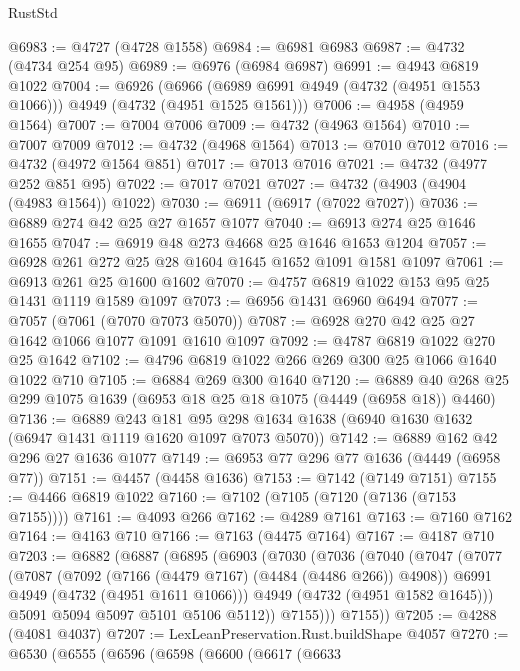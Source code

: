\begin{lexlean}{RustStd}
\begin{coremodule}
@6983 := @4727 (@4728 @1558)
@6984 := @6981 @6983
@6987 := @4732 (@4734 @254 @95)
@6989 := @6976 (@6984 @6987)
@6991 := @4943 @6819 @1022
@7004 := @6926
    (@6966 (@6989 @6991 @4949 (@4732 (@4951 @1553 @1066))) @4949 (@4732 (@4951 @1525 @1561)))
@7006 := @4958 (@4959 @1564)
@7007 := @7004 @7006
@7009 := @4732 (@4963 @1564)
@7010 := @7007 @7009
@7012 := @4732 (@4968 @1564)
@7013 := @7010 @7012
@7016 := @4732 (@4972 @1564 @851)
@7017 := @7013 @7016
@7021 := @4732 (@4977 @252 @851 @95)
@7022 := @7017 @7021
@7027 := @4732 (@4903 (@4904 (@4983 @1564)) @1022)
@7030 := @6911 (@6917 (@7022 @7027))
@7036 := @6889 @274 @42 @25 @27 @1657 @1077
@7040 := @6913 @274 @25 @1646 @1655
@7047 := @6919 @48 @273 @4668 @25 @1646 @1653 @1204
@7057 := @6928 @261 @272 @25 @28 @1604 @1645 @1652 @1091 @1581 @1097
@7061 := @6913 @261 @25 @1600 @1602
@7070 := @4757 @6819 @1022 @153 @95 @25 @1431 @1119 @1589 @1097
@7073 := @6956 @1431 @6960 @6494
@7077 := @7057 (@7061 (@7070 @7073 @5070))
@7087 := @6928 @270 @42 @25 @27 @1642 @1066 @1077 @1091 @1610 @1097
@7092 := @4787 @6819 @1022 @270 @25 @1642
@7102 := @4796 @6819 @1022 @266 @269 @300 @25 @1066 @1640 @1022 @710
@7105 := @6884 @269 @300 @1640
@7120 := @6889 @40 @268 @25 @299 @1075 @1639 (@6953 @18 @25 @18 @1075 (@4449 (@6958 @18)) @4460)
@7136 := @6889
    @243
    @181
    @95
    @298
    @1634
    @1638
    (@6940 @1630 @1632 (@6947 @1431 @1119 @1620 @1097 @7073 @5070))
@7142 := @6889 @162 @42 @296 @27 @1636 @1077
@7149 := @6953 @77 @296 @77 @1636 (@4449 (@6958 @77))
@7151 := @4457 (@4458 @1636)
@7153 := @7142 (@7149 @7151)
@7155 := @4466 @6819 @1022
@7160 := @7102 (@7105 (@7120 (@7136 (@7153 @7155))))
@7161 := @4093 @266
@7162 := @4289 @7161
@7163 := @7160 @7162
@7164 := @4163 @710
@7166 := @7163 (@4475 @7164)
@7167 := @4187 @710
@7203 := @6882
    (@6887
      (@6895
        (@6903
          (@7030
            (@7036
              (@7040
                (@7047
                  (@7077
                    (@7087
                      (@7092 (@7166 (@4479 @7167) (@4484 (@4486 @266)) @4908))
                      @6991
                      @4949
                      (@4732 (@4951 @1611 @1066)))
                    @4949
                    (@4732 (@4951 @1582 @1645)))
                  @5091
                  @5094
                  @5097
                  @5101
                  @5106
                  @5112))
              @7155)))
        @7155))
@7205 := @4288 (@4081 @4037)
@7207 := LexLeanPreservation.Rust.buildShape @4057
@7270 := @6530
    (@6555
      (@6596
        (@6598
          (@6600
            (@6617
              (@6633

\end{coremodule}
\end{lexlean}
